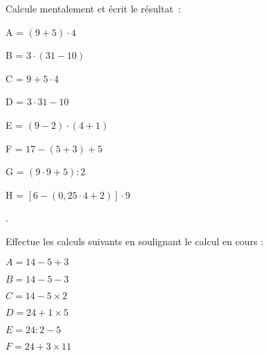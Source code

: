 \begin{exercice}
Calcule mentalement et écrit le résultat :
 \begin{colitemize}{2}
 \item A = $(9 + 5) \cdot 4$

 \dotfill
 
 \item B = $3 \cdot (31 - 10)$
 
 \dotfill
 
 \item C = $9 + 5 \cdot 4$

 \dotfill
 
 \item D = $3 \cdot 31 - 10$   
 
 \dotfill
   
 \item E = $(9 - 2) \cdot (4 + 1)$
 
 \dotfill
 
 \item F = $17 - (5 + 3) + 5$
 
 \dotfill
 
 \item G = $(9 \cdot 9 + 5) : 2$
 
 \dotfill
   
 \item {\footnotesize H = $[6 - (0,25 \cdot 4 + 2)] \cdot 9$}
 
 \dotfill.
 \end{colitemize}
\end{exercice}

\vspace{2cm}

\begin{exercice}
Effectue les calculs suivants en soulignant le calcul en cours :
 \begin{colitemize}{2}
\item $A = 14 - 5 + 3$

\dotfill

\dotfill

\item $B = 14 - 5 - 3$

\dotfill

\dotfill
	
\item $C = 14 - 5 \times 2$

\dotfill

\dotfill

\item $D = 24 + 1 \times 5$

\dotfill

\dotfill
	
\item $E = 24 : 2 - 5$

\dotfill

\dotfill
	
\item $F = 24 + 3 \times 11$

\dotfill

\dotfill

 \end{colitemize}
\end{exercice}


